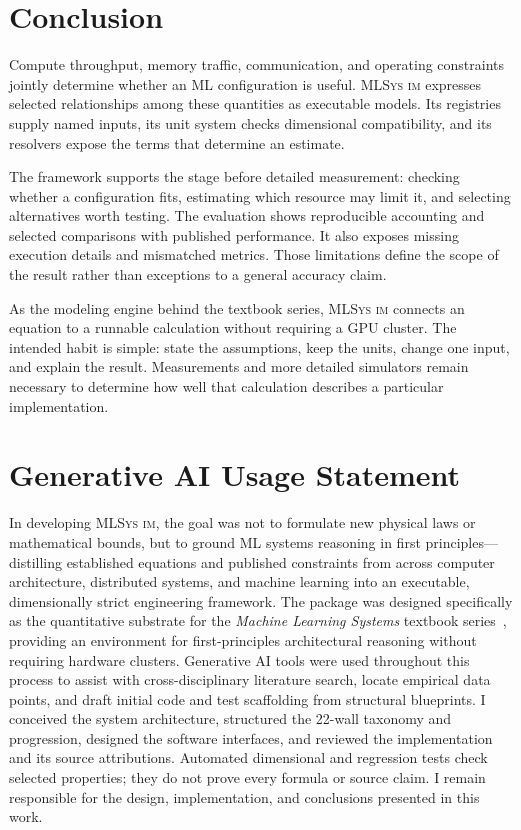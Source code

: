 \documentclass[10pt,twocolumn]{article}
\newcommand{\mlsysim}{\mbox{\textsc{MLSys}\,\textperiodcentered\,\textsc{im}}\xspace}
\begin{document}
\section{Conclusion}
\label{sec:conclusion}

Compute throughput, memory traffic, communication, and operating constraints jointly determine whether an ML configuration is useful. \mlsysim expresses selected relationships among these quantities as executable models. Its registries supply named inputs, its unit system checks dimensional compatibility, and its resolvers expose the terms that determine an estimate.

The framework supports the stage before detailed measurement: checking whether a configuration fits, estimating which resource may limit it, and selecting alternatives worth testing. The evaluation shows reproducible accounting and selected comparisons with published performance. It also exposes missing execution details and mismatched metrics. Those limitations define the scope of the result rather than exceptions to a general accuracy claim.

As the modeling engine behind the textbook series, \mlsysim connects an equation to a runnable calculation without requiring a GPU cluster. The intended habit is simple: state the assumptions, keep the units, change one input, and explain the result. Measurements and more detailed simulators remain necessary to determine how well that calculation describes a particular implementation.

\section*{Generative AI Usage Statement}

In developing \mlsysim, the goal was not to formulate new physical laws or mathematical bounds, but to ground ML systems reasoning in first principles---distilling established equations and published constraints from across computer architecture, distributed systems, and machine learning into an executable, dimensionally strict engineering framework. The package was designed specifically as the quantitative substrate for the \emph{Machine Learning Systems} textbook series~\citep{mlsysbook2025}, providing an environment for first-principles architectural reasoning without requiring hardware clusters. Generative AI tools were used throughout this process to assist with cross-disciplinary literature search, locate empirical data points, and draft initial code and test scaffolding from structural blueprints. I conceived the system architecture, structured the 22-wall taxonomy and progression, designed the software interfaces, and reviewed the implementation and its source attributions. Automated dimensional and regression tests check selected properties; they do not prove every formula or source claim. I remain responsible for the design, implementation, and conclusions presented in this work.
\end{document}
